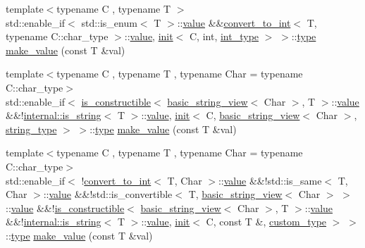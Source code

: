 \begin{DoxyCompactItemize}
\item 
{\footnotesize template$<$typename C , typename T $>$ }\\std\+::enable\+\_\+if$<$ std\+::is\+\_\+enum$<$ T $>$\+::\hyperlink{classinternal_1_1value}{value} \&\&\hyperlink{structconvert__to__int}{convert\+\_\+to\+\_\+int}$<$ T, typename C\+::char\+\_\+type $>$\+::\hyperlink{classinternal_1_1value}{value}, \hyperlink{structinternal_1_1init}{init}$<$ C, int, \hyperlink{namespaceinternal_a8661864098ac0acff9a6dd7e66f59038a8be38ea7253d1a414964476f31d00064}{int\+\_\+type} $>$ $>$\+::\hyperlink{namespaceinternal_a8661864098ac0acff9a6dd7e66f59038}{type} \hyperlink{namespaceinternal_a3d03eb7eebca822d2083354e5a7ec60a}{make\+\_\+value} (const T \&val)
\item 
{\footnotesize template$<$typename C , typename T , typename Char  = typename C\+::char\+\_\+type$>$ }\\std\+::enable\+\_\+if$<$ \hyperlink{structis__constructible}{is\+\_\+constructible}$<$ \hyperlink{classbasic__string__view}{basic\+\_\+string\+\_\+view}$<$ Char $>$, T $>$\+::\hyperlink{classinternal_1_1value}{value} \&\&!\hyperlink{structinternal_1_1is__string}{internal\+::is\+\_\+string}$<$ T $>$\+::\hyperlink{classinternal_1_1value}{value}, \hyperlink{structinternal_1_1init}{init}$<$ C, \hyperlink{classbasic__string__view}{basic\+\_\+string\+\_\+view}$<$ Char $>$, \hyperlink{namespaceinternal_a8661864098ac0acff9a6dd7e66f59038a8a104d760e6ea540da0d654ca8728d55}{string\+\_\+type} $>$ $>$\+::\hyperlink{namespaceinternal_a8661864098ac0acff9a6dd7e66f59038}{type} \hyperlink{namespaceinternal_a9e2275f74beb9eaeea39e65d24311802}{make\+\_\+value} (const T \&val)
\item 
{\footnotesize template$<$typename C , typename T , typename Char  = typename C\+::char\+\_\+type$>$ }\\std\+::enable\+\_\+if$<$ !\hyperlink{structconvert__to__int}{convert\+\_\+to\+\_\+int}$<$ T, Char $>$\+::\hyperlink{classinternal_1_1value}{value} \&\&!std\+::is\+\_\+same$<$ T, Char $>$\+::\hyperlink{classinternal_1_1value}{value} \&\&!std\+::is\+\_\+convertible$<$ T, \hyperlink{classbasic__string__view}{basic\+\_\+string\+\_\+view}$<$ Char $>$ $>$\+::\hyperlink{classinternal_1_1value}{value} \&\&!\hyperlink{structis__constructible}{is\+\_\+constructible}$<$ \hyperlink{classbasic__string__view}{basic\+\_\+string\+\_\+view}$<$ Char $>$, T $>$\+::\hyperlink{classinternal_1_1value}{value} \&\&!\hyperlink{structinternal_1_1is__string}{internal\+::is\+\_\+string}$<$ T $>$\+::\hyperlink{classinternal_1_1value}{value}, \hyperlink{structinternal_1_1init}{init}$<$ C, const T \&, \hyperlink{namespaceinternal_a8661864098ac0acff9a6dd7e66f59038a7f81f24620187ebe99e60e9e42ab9b15}{custom\+\_\+type} $>$ $>$\+::\hyperlink{namespaceinternal_a8661864098ac0acff9a6dd7e66f59038}{type} \hyperlink{namespaceinternal_a61c7dd9f9c0883dd5a487ca563e632f4}{make\+\_\+value} (const T \&val)

\end{DoxyCompactItemize}
